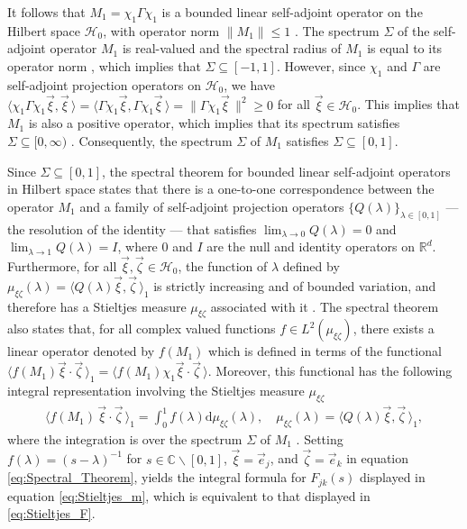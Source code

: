 \documentclass{cmslatex}
\renewcommand{\d}{\text{d}}
\begin{document}
It follows that $M_1=\chi_1\Gamma\chi_1$ is a bounded linear self-adjoint
operator on the Hilbert space $\mathscr{H}_0$, with operator norm
$\|M_1\|\leq1$ \cite{Reed-1980,Stone:64}. The spectrum $\Sigma$ of the
self-adjoint operator $M_1$ is real-valued and the spectral radius of $M_1$ is equal to
its operator norm \cite{Reed-1980}, which implies that
$\Sigma\subseteq[-1,1]$. However, since $\chi_1$ and $\Gamma$ are self-adjoint projection
operators on $\mathscr{H}_0$, we have 
$\langle\chi_1\Gamma\chi_1\vec{\xi},\vec{\xi}\,\rangle=\langle\Gamma\chi_1\vec{\xi},\Gamma\chi_1\vec{\xi}\,\rangle=\|\Gamma\chi_1\vec{\xi}\,\|^2\geq0$ 
for all $\vec{\xi}\in\mathscr{H}_0$. This implies that $M_1$ is also a
positive operator, which implies that its spectrum satisfies $\Sigma\subseteq[0,\infty)$
\cite{Stone:64}.  Consequently, the spectrum $\Sigma$ of $M_1$ satisfies
$\Sigma\subseteq[0,1]$.       



Since $\Sigma\subseteq[0,1]$, the spectral theorem for bounded linear self-adjoint
operators in Hilbert space \cite{Stone:64} states that there is a
one-to-one correspondence between the operator $M_1$ and a family of
self-adjoint projection operators $\{Q(\lambda)\}_{\lambda\in[0,1]}$ --- the
resolution of the identity --- that satisfies $\lim_{\lambda\to0}Q(\lambda)=0$ and
$\lim_{\lambda\to1}Q(\lambda)=I$, where $0$ and $I$ are the null and identity
operators on $\mathbb{R}^d$. Furthermore, for all
$\vec{\xi},\vec{\zeta}\in\mathscr{H}_0$, the function of $\lambda$ defined by 
$\mu_{\xi\zeta}(\lambda)=\langle Q(\lambda)\vec{\xi},\vec{\zeta}\,\rangle_1$ is strictly increasing and of
bounded variation, and therefore has a Stieltjes measure $\mu_{\xi\zeta}$
associated with it \cite{Stieltjes:1995,Stone:64,Folland:95}. The
spectral theorem also states that, for all complex
valued functions $f\in L^2(\mu_{\xi\zeta})$, there exists a linear operator
denoted by $f(M_1)$ which is defined in terms of the functional
$\langle f(M_1)\vec{\xi}\cdot\vec{\zeta}\,\rangle_1=\langle f(M_1)\chi_1\vec{\xi}\cdot\vec{\zeta}\,\rangle$. Moreover,
this functional has the following integral representation involving the
Stieltjes measure $\mu_{\xi\zeta}$  
% 
\begin{align}\label{eq:Spectral_Theorem}  
  \langle f(M_1)\,\vec{\xi}\cdot\vec{\zeta}\,\rangle_1= \int_0^1f(\lambda)\d\mu_{\xi\zeta}(\lambda), \quad
  \mu_{\xi\zeta}(\lambda)=\langle Q(\lambda)\vec{\xi},\vec{\zeta}\,\rangle_1,
\end{align}
%
where the integration is over the spectrum $\Sigma$ of $M_1$
\cite{Reed-1980,Stone:64}. Setting $f(\lambda)=(s-\lambda)^{-1}$ for
$s\in\mathbb{C}\backslash[0,1]$, $\vec{\xi}=\vec{e}_j$, and $\vec{\zeta}=\vec{e}_k$ in
equation \eqref{eq:Spectral_Theorem}, yields the integral formula for
$F_{jk}(s)$ displayed in equation \eqref{eq:Stieltjes_m}, which is
equivalent to that displayed in \eqref{eq:Stieltjes_F}.  
\end{document}

